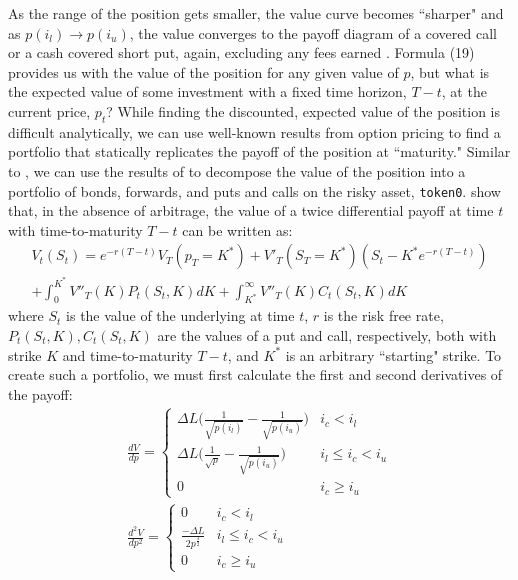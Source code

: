 \documentclass[11pt]{article}
\begin{document}
As the range of the position gets smaller, the value curve becomes ``sharper" and as $p(i_l) \rightarrow p(i_u)$, the value converges to the payoff diagram of a covered call or a cash covered short put, again, excluding any fees earned \citep{LambertMedium1}. Formula (19) provides us with the value of the position for any given value of $p$, but what is the expected value of some investment with a fixed time horizon, $T - t$, at the current price, $p_t$? While finding the discounted, expected value of the position is difficult analytically, we can use well-known results from option pricing to find a portfolio that statically replicates the payoff of the position at ``maturity." Similar to \citet{ClarkReplicatingPortfolio}, we can use the results of \citet{Carr98towardsa} to decompose the value of the position into a portfolio of bonds, forwards, and puts and calls on the risky asset, \texttt{token0}. \citet{Carr98towardsa} show that, in the absence of arbitrage, the value of a twice differential payoff at time $t$ with time-to-maturity $T - t$ can be written as:
\begin{gather*}
    V_t(S_t) = e^{-r(T-t)} V_T(p_T = K^*) + V'_T(S_T = K^*)(S_t - K^* e^{-r(T-t)}) \\
    + \int_0^{K^*} V''_T(K) P_t(S_t, K) dK + \int_{K^*}^{\infty} V''_T(K) C_t(S_t, K) dK
\end{gather*}
where $S_t$ is the value of the underlying at time $t$, $r$ is the risk free rate, $P_t(S_t, K), C_t(S_t, K)$ are the values of a put and call, respectively, both with strike $K$ and time-to-maturity $T - t$, and $K^*$ is an arbitrary ``starting" strike. To create such a portfolio, we must first calculate the first and second derivatives of the payoff:
\begin{gather*}
    \frac{dV}{dp} =
    \begin{cases}
        \Delta L \bigg( \frac{1}{\sqrt{p(i_l)}} - \frac{1}{\sqrt{p(i_u)}} \bigg) & i_c < i_l \\
        \Delta L \bigg( \frac{1}{\sqrt{p}} - \frac{1}{\sqrt{p(i_u)}} \bigg) & i_l \le i_c < i_u \\
        0 & i_c \ge i_u
    \end{cases}  \\
    \frac{d^2 V}{dp^2} =
    \begin{cases}
        0 & i_c < i_l \\
        \frac{-\Delta L}{2 p^{\frac{3}{2}}} & i_l \le i_c < i_u \\
        0 & i_c \ge i_u
    \end{cases}
\end{gather*}
\end{document}
